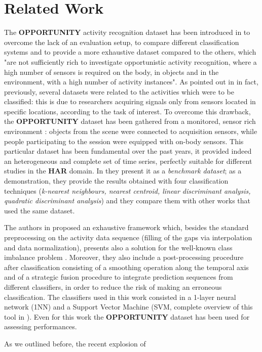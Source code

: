 
\section{Related Work}
\label{sec:related_work}
The \textbf{OPPORTUNITY} activity recognition dataset has been introduced in \cite{ComplexAct-2010} to overcome the lack of an evaluation setup, to compare different classification systems and to provide a more exhaustive dataset compared to the others, which "are not sufficiently rich to investigate opportunistic activity recognition, where a high number of sensors is required on the body, in objects and in the environment, with a high number of activity instances". As pointed out in \cite{Chavarriaga2013} in fact, previously, several datasets were related to the activities which were to be classified: this is due to researchers acquiring signals only from sensors located in specific locations, according to the task of interest.
To overcome this drawback, the \textbf{OPPORTUNITY} dataset has been gathered from a monitored, sensor rich environment  : objects from the scene were connected to acquisition sensors, while people participating to the session were equipped with on-body sensors. This particular dataset has been fundamental over the past years, it provided indeed an heterogeneous and complete set of time series, perfectly suitable for different studies in the \textbf{HAR} domain. In \cite{Chavarriaga2013} they present it as a \textit{benchmark dataset}; as a demonstration, they provide the results obtained with four classification techniques (\textit{k-nearest neighbours, nearest centroid, linear discriminant analysis, quadratic discriminant analysis}) and they compare them with other works that used the same dataset. 

The authors in \cite{cao2012integrated} proposed an exhaustive framework which, besides the standard preprocessing on the activity data sequence (filling of the gaps via interpolation and data normalization), presents also a solution for the well-known class imbalance problem \cite{japkowicz2002class}. Moreover, they also include a post-processing procedure after classification consisting of a smoothing operation along the temporal axis  and of a strategic fusion procedure to integrate prediction sequences from different classifiers, in order to reduce the risk of making an erroneous classification. The classifiers used in this work consisted in a 1-layer neural network (1NN) and a Support Vector Machine (SVM, complete overview of this tool in \cite{hearst1998support}). Even for this work the \textbf{OPPORTUNITY} dataset has been used for assessing performances.

As we outlined before, the recent explosion of 